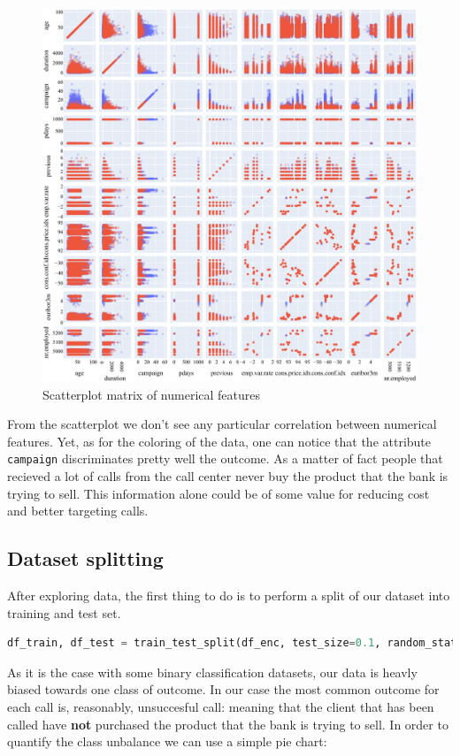 \begin{figure}[H]
    \centering
    \includegraphics[scale=0.55]{pictures/scatterplot.pdf}
    \caption{Scatterplot matrix of numerical features }
\end{figure}
From the scatterplot we don't see any particular correlation between numerical features. Yet, as for the coloring of the data, one can notice that the attribute \texttt{campaign} discriminates pretty well the outcome. As a matter of fact people that recieved a lot of calls from the call center never buy the product that the bank is trying to sell. This information alone could be of some value for reducing cost and better targeting calls.

\subsection{Dataset splitting} \label{dataset_splitting}
After exploring data, the first thing to do is to perform a split of our dataset into training and test set.
\begin{lstlisting}[language=Python, caption= Data splitting]
    df_train, df_test = train_test_split(df_enc, test_size=0.1, random_state=42)
\end{lstlisting}
As it is the case with some binary classification datasets, our data is heavly biased towards one class of outcome. In our case the most common outcome for each call is, reasonably, unsuccesful call: meaning that the client that has been called have \textbf{not} purchased the product that the bank is trying to sell. In order to quantify the class unbalance we can use a simple pie chart:

